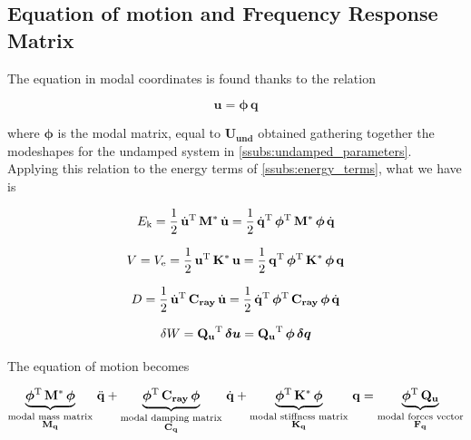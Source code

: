 \documentclass[a4paper,12pt,oneside]{article}
\begin{document}
\vspace{20pt}

\subsection{Equation of motion and Frequency Response Matrix}

The equation in modal coordinates is found thanks to the relation

\[ \mathbf{u} = \bm{\phi} \, \mathbf{q} \]

\vspace{10pt}

where $ \bm{\phi} $ is the modal matrix, equal to $ \mathbf{U_{und}} $ obtained gathering together the modeshapes for the undamped system in \ref{ssubs:undamped_parameters}. Applying this relation to the energy terms of \ref{ssubs:energy_terms}, what we have is

\[
	E_\textup{k} =
		\frac{1}{2} \, \dot{\mathbf{u}}^\textup{T} \, \mathbf{M^*} \, \dot{\mathbf{u}} =
		\frac{1}{2} \, \dot{\mathbf{q}}^\textup{T} \,	\bm{\phi}^\textup{T} \,
		\mathbf{M^*} \, \bm{\phi} \, \dot{\mathbf{q}}
\]

\[
	V = V_\textup{e} =
		\frac{1}{2} \, \mathbf{u}^\textup{T} \, \mathbf{K^*} \, \mathbf{u} =
		\frac{1}{2} \, \mathbf{q}^\textup{T} \,	\bm{\phi}^\textup{T} \,
		\mathbf{K^*} \, \bm{\phi} \, \mathbf{q}
\]

\[
	D = \frac{1}{2} \, \dot{\mathbf{u}}^\textup{T} \,	\mathbf{C_{ray}} \,
		\dot{\mathbf{u}} =
		\frac{1}{2} \, \dot{\mathbf{q}}^\textup{T} \,	\bm{\phi}^\textup{T} \,
		\mathbf{C_{ray}} \, \bm{\phi} \, \dot{\mathbf{q}}
\]

\[
	\delta W = \mathbf{Q_u}^\textup{T} \, \bm{\delta u} =
		\mathbf{Q_u}^\textup{T} \, \bm{\phi} \, \bm{\delta q}
\]

The equation of motion becomes

\[
	\underbrace{\bm{\phi}^\textup{T} \, \mathbf{M^*} \, \bm{\phi}}_
		{\substack{\text{modal mass matrix} \\
		\text{$ \mathbf{M_q} $}}} \, \ddot{\mathbf{q}} +
		\underbrace{\bm{\phi}^\textup{T} \, \mathbf{C_{ray}} \,	\bm{\phi}}_
		{\substack{\text{modal damping matrix} \\
		\text{$ \mathbf{C_q} $}}} \, \dot{\mathbf{q}} +
		\underbrace{\bm{\phi}^\textup{T} \, \mathbf{K^*} \, \bm{\phi}}_
		{\substack{\text{modal stiffness matrix} \\
		\text{$ \mathbf{K_q} $}}} \, \mathbf{q} =
		\underbrace{\bm{\phi}^\textup{T} \, \mathbf{Q_u}}_
		{\substack{\text{modal forces vector} \\
		\text{$ \mathbf{F_q} $}}}
\]
\end{document}
